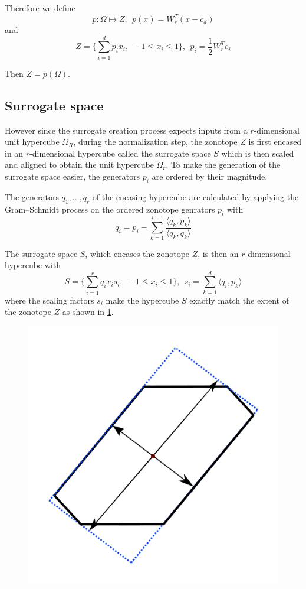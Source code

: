 \documentclass[
  a4paper,  %
  twoside,  %
  bibliography=totoc,
  headsepline,
  cleardoublepage=empty,
  parskip=half,
  draft=false
]{scrbook}
\begin{document}
Therefore we define
\begin{equation}
p \colon \Omega \mapsto Z, ~~ p(x)=W_r^T (x-c_d)
\end{equation}
and
\begin{equation}
Z=\{\sum_{i=1}^d p_i x_i , ~ -1 \leq x_i \leq 1\}, ~~ p_i=\frac{1}{2} W_r^T e_i
\end{equation}

Then $Z=p(\Omega)$.

\subsection{Surrogate space}

However since the surrogate creation process expects inputs from a $r$-dimensional unit hypercube $\Omega_R$, during the normalization step, the zonotope $Z$ is first encased in an $r$-dimensional hypercube called the surrogate space $S$ which is then scaled and aligned to obtain the unit hypercube $\Omega_r$.
To make the generation of the surrogate space easier, the generators $p_i$ are ordered by their magnitude.

The generators $q_1, \dots, q_r$ of the encasing hypercube are calculated by applying the Gram–Schmidt process on the ordered zonotope genrators $p_i$ with
\begin{equation}
q_i=p_i - \sum_{k=1}^{i-1} \frac{\langle q_k, p_k\rangle}{\langle q_k, q_k\rangle}
\nonumber
\end{equation}

The surrogate space $S$, which encases the zonotope $Z$, is then an $r$-dimensional hypercube with
\begin{equation}
S=\{\sum_{i=1}^r q_i x_i s_i , ~ -1 \leq x_i \leq 1\},~~ s_i=\sum_{k=1}^d \langle q_i, p_k\rangle
\label{surrogate_space}
\end{equation}
where the scaling factors $s_i$ make the hypercube $S$ exactly match the extent of the zonotope $Z$ as shown in \ref{fig:surrogate_space}.


\begin{figure}[H]
\centering
  \includegraphics[width=0.4\linewidth]{graphics/s}
  \label{fig:surrogate_space}
\end{figure}
\end{document}
